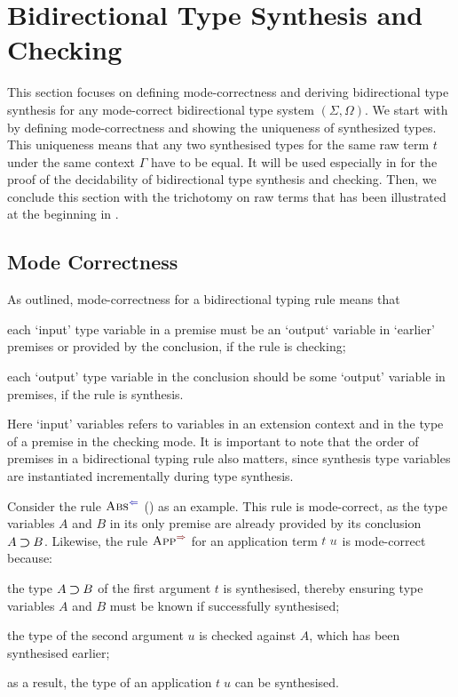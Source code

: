 
\section{Bidirectional Type Synthesis and Checking} \label{sec:type-synthesis}
This section focuses on defining mode-correctness and deriving bidirectional type synthesis for any mode-correct bidirectional type system $(\Sigma, \Omega)$.
We start with  by defining mode-correctness and showing the uniqueness of synthesized types.
This uniqueness means that any two synthesised types for the same raw term $t$ under the same context $\Gamma$ have to be equal.
It will be used especially in  for the proof of the decidability of bidirectional type synthesis and checking.
Then, we conclude this section with the trichotomy on raw terms that has been illustrated at the beginning in .

\subsection{Mode Correctness}\label{sec:mode-correctness}
As \citet{Dunfield2021} outlined, mode-correctness for a bidirectional typing rule means that 
\begin{enumerate*}
\item each `input' type variable in a premise must be an `output` variable in `earlier' premises or provided by the conclusion, if the rule is checking;
\item each `output' type variable in the conclusion should be some `output' variable in premises, if the rule is synthesis.
\end{enumerate*}
Here `input' variables refers to variables in an extension context and in the type of a premise in the checking mode.
It is important to note that the order of premises in a bidirectional typing rule also matters, since synthesis type variables are instantiated incrementally during type synthesis.

Consider the rule $\ChkRule{Abs}$ () as an example.
This rule is mode-correct, as the type variables $A$ and $B$ in its only premise are already provided by its conclusion $A \mathbin{\bm{\supset}} B$.
Likewise, the rule $\SynRule{App}$ for an application term $\isTerm{t\;u}$ is mode-correct because:
\begin{enumerate*}
\item the type $A \mathbin{\bm{\supset}} B$ of the first argument $t$ is synthesised, thereby ensuring type variables $A$ and $B$ must be known if successfully synthesised;
\item the type of the second argument $u$ is checked against $A$, which has been synthesised earlier;
\item as a result, the type of an application $t\;u$ can be synthesised.
\end{enumerate*}


